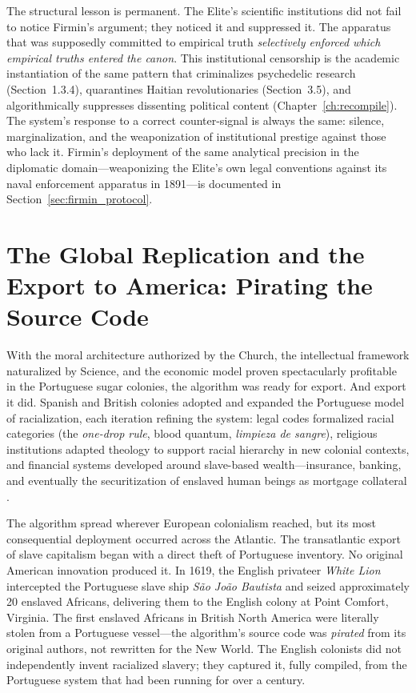 The structural lesson is permanent. The Elite's scientific institutions did not fail to notice Firmin's argument; they noticed it and suppressed it. The apparatus that was supposedly committed to empirical truth \textit{selectively enforced which empirical truths entered the canon}. This institutional censorship is the academic instantiation of the same pattern that criminalizes psychedelic research (Section~1.3.4), quarantines Haitian revolutionaries (Section~3.5), and algorithmically suppresses dissenting political content (Chapter~\ref{ch:recompile}). The system's response to a correct counter-signal is always the same: silence, marginalization, and the weaponization of institutional prestige against those who lack it. Firmin's deployment of the same analytical precision in the diplomatic domain---weaponizing the Elite's own legal conventions against its naval enforcement apparatus in 1891---is documented in Section~\ref{sec:firmin_protocol}.

\section{The Global Replication and the Export to America: Pirating the Source Code}

With the moral architecture authorized by the Church, the intellectual framework naturalized by Science, and the economic model proven spectacularly profitable in the Portuguese sugar colonies, the algorithm was ready for export. And export it did. Spanish and British colonies adopted and expanded the Portuguese model of racialization, each iteration refining the system: legal codes formalized racial categories (the \textit{one-drop rule}, blood quantum, \textit{limpieza de sangre}), religious institutions adapted theology to support racial hierarchy in new colonial contexts, and financial systems developed around slave-based wealth---insurance, banking, and eventually the securitization of enslaved human beings as mortgage collateral \cite{beckert, johnson}.

The algorithm spread wherever European colonialism reached, but its most consequential deployment occurred across the Atlantic. The transatlantic export of slave capitalism began with a direct theft of Portuguese inventory. No original American innovation produced it. In 1619, the English privateer \textit{White Lion} intercepted the Portuguese slave ship \textit{S\~{a}o Jo\~{a}o Bautista} and seized approximately 20 enslaved Africans, delivering them to the English colony at Point Comfort, Virginia. The first enslaved Africans in British North America were literally stolen from a Portuguese vessel---the algorithm's source code was \textit{pirated} from its original authors, not rewritten for the New World. The English colonists did not independently invent racialized slavery; they captured it, fully compiled, from the Portuguese system that had been running for over a century.

